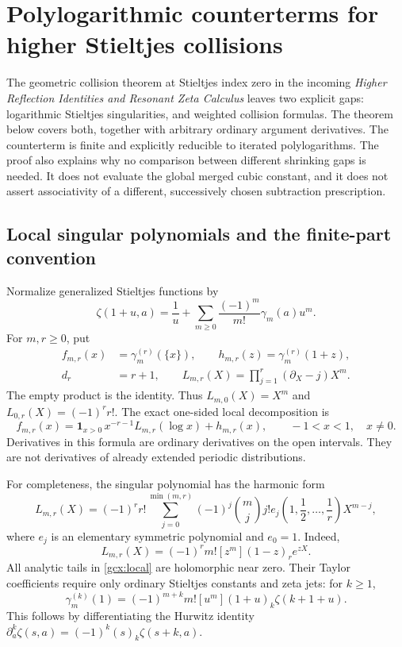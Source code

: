 \section{Polylogarithmic counterterms for higher Stieltjes collisions}
\label{gcx:section}

The geometric collision theorem at Stieltjes index zero in the incoming
\emph{Higher Reflection Identities and Resonant Zeta Calculus}\cite{repo:reflection} leaves two explicit gaps: logarithmic
Stieltjes singularities, and weighted collision formulas.  The theorem below
covers both, together with arbitrary ordinary argument derivatives.  The
counterterm is finite and explicitly reducible to iterated polylogarithms.
The proof also explains why no comparison between different shrinking gaps
is needed.  It does not evaluate the global merged cubic constant, and it
does not assert associativity of a different, successively chosen
subtraction prescription.

\subsection{Local singular polynomials and the finite-part convention}

Normalize generalized Stieltjes functions by
\[
 \zeta(1+u,a)=\frac1u+
       \sum_{m\ge0}\frac{(-1)^m}{m!}\gamma_m(a)u^m.
\]
For $m,r\ge0$, put
\begin{align}
 f_{m,r}(x)&=\gamma_m^{(r)}(\{x\}),\qquad
 h_{m,r}(z)=\gamma_m^{(r)}(1+z),\label{gcx:fg}\\
 d_r&=r+1,\qquad
 L_{m,r}(X)=\prod_{j=1}^{r}(\partial_X-j)X^m.
 \label{gcx:sing-polynomial}
\end{align}
The empty product is the identity.  Thus $L_{m,0}(X)=X^m$ and
$L_{0,r}(X)=(-1)^r r!$.  The exact one-sided local decomposition is
\begin{equation}\label{gcx:local}
 f_{m,r}(x)=\boldsymbol 1_{x>0}\,
              x^{-r-1}L_{m,r}(\log x)+h_{m,r}(x),
 \qquad -1<x<1,\quad x\ne0.
\end{equation}
Derivatives in this formula are ordinary derivatives on the open
intervals.  They are not derivatives of already extended periodic
distributions.

For completeness, the singular polynomial has the harmonic form
\begin{equation}\label{gcx:harmonic-poly}
 L_{m,r}(X)=(-1)^r r!
 \sum_{j=0}^{\min(m,r)}(-1)^j\binom mj j!
 e_j\left(1,\frac12,\ldots,\frac1r\right)X^{m-j},
\end{equation}
where $e_j$ is an elementary symmetric polynomial and $e_0=1$.
Indeed,
\[
 L_{m,r}(X)=(-1)^r m![z^m](1-z)_r e^{zX}.
\]
All analytic tails in \eqref{gcx:local} are holomorphic near zero.  Their
Taylor coefficients require only ordinary Stieltjes constants and zeta
jets: for $k\ge1$,
\begin{equation}\label{gcx:tail-derivative}
 \gamma_m^{(k)}(1)=(-1)^{m+k}m![u^m](1+u)_k\zeta(k+1+u).
\end{equation}
This follows by differentiating the Hurwitz identity
$\partial_a^k\zeta(s,a)=(-1)^k(s)_k\zeta(s+k,a)$.

